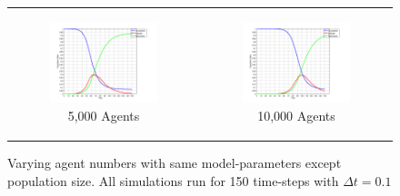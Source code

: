 \begin{figure}
\begin{center}
\begin{tabular}{c c}
    	\\
    	
		\begin{subfigure}[b]{0.3\textwidth}
			\centering
			\includegraphics[width=1\textwidth, angle=0]{./shared/fig/frabs/SIR_5000agents_150t_01dt_NOSS_parallel.png}
			\caption{5,000 Agents}
			\label{fig:sir_abs_approximating_5000}
		\end{subfigure}
		& 
		\begin{subfigure}[b]{0.3\textwidth}
			\centering
			\includegraphics[width=1\textwidth, angle=0]{./shared/fig/frabs/SIR_10000agents_150t_01dt_NOSS_parallel.png}
			\caption{10,000 Agents}
			\label{fig:sir_abs_approximating_10000}
		\end{subfigure}
	\end{tabular}
	
	\caption{Varying agent numbers with same model-parameters except population size. All simulations run for 150 time-steps with $\Delta t = 0.1$}
	\label{fig:sir_abs_approximating}
\end{center}
\end{figure}

